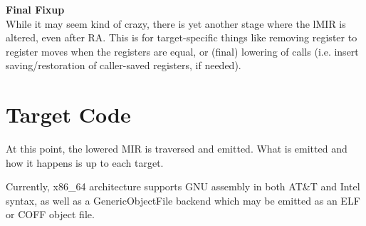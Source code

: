 \documentclass[12pt]{article}
\begin{document}
\noindent\textbf{Final Fixup}\\
\indent While it may seem kind of crazy, there is yet another stage where the lMIR is altered, even after RA. This is for target-specific things like removing register to register moves when the registers are equal, or (final) lowering of calls (i.e. insert saving/restoration of caller-saved registers, if needed).

\section{Target Code}
\label{sec:target-code}

At this point, the lowered MIR is traversed and emitted. What is emitted and how it happens is up to each target.

Currently, x86\_64 architecture supports GNU assembly in both AT\&T and Intel syntax, as well as a GenericObjectFile backend which may be emitted as an ELF or COFF object file.

\end{document}
